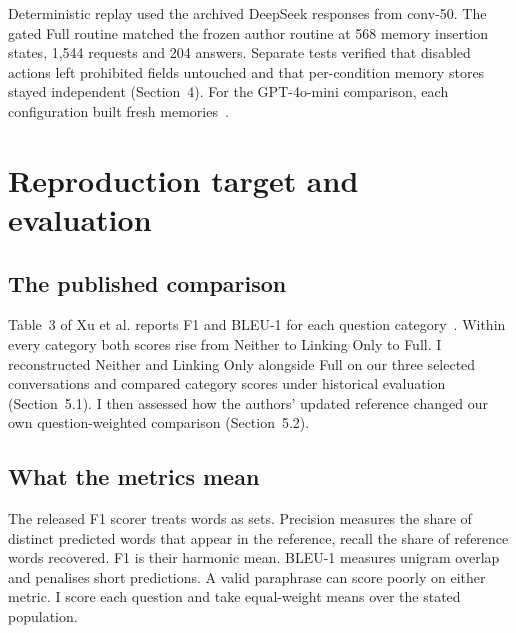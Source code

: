 \documentclass[11pt,a4paper]{article}
\begin{document}
Deterministic replay used the archived DeepSeek responses from conv-50. The gated Full routine matched the frozen author routine at 568 memory insertion states, 1,544 requests and 204 answers. Separate tests verified that disabled actions left prohibited fields untouched and that per-condition memory stores stayed independent (Section~4). For the GPT-4o-mini comparison, each configuration built fresh memories~\cite{reproduction,acceptedresults}.

\section{Reproduction target and evaluation}
\subsection{The published comparison}
Table~3 of Xu et al. reports F1 and BLEU-1 for each question category~\cite{xu2025amem}. Within every category both scores rise from Neither to Linking Only to Full. I reconstructed Neither and Linking Only alongside Full on our three selected conversations and compared category scores under historical evaluation (Section~5.1). I then assessed how the authors’ updated reference changed our own question-weighted comparison (Section~5.2).

\subsection{What the metrics mean}
The released F1 scorer treats words as sets. Precision measures the share of distinct predicted words that appear in the reference, recall the share of reference words recovered. F1 is their harmonic mean. BLEU-1 measures unigram overlap and penalises short predictions. A valid paraphrase can score poorly on either metric. I score each question and take equal-weight means over the stated population.
\end{document}
